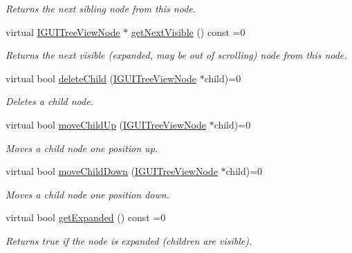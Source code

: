\begin{DoxyCompactItemize}
\begin{DoxyCompactList}\small\item\em Returns the next sibling node from this node. \end{DoxyCompactList}\item 
virtual \hyperlink{classirr_1_1gui_1_1IGUITreeViewNode}{I\+G\+U\+I\+Tree\+View\+Node} $\ast$ \hyperlink{classirr_1_1gui_1_1IGUITreeViewNode_add12cd0ee7b12a49c0f140741f9449fb}{get\+Next\+Visible} () const =0
\begin{DoxyCompactList}\small\item\em Returns the next visible (expanded, may be out of scrolling) node from this node. \end{DoxyCompactList}\item 
virtual bool \hyperlink{classirr_1_1gui_1_1IGUITreeViewNode_a26d0ce5bc0a6e7814f69d68033c30242}{delete\+Child} (\hyperlink{classirr_1_1gui_1_1IGUITreeViewNode}{I\+G\+U\+I\+Tree\+View\+Node} $\ast$child)=0
\begin{DoxyCompactList}\small\item\em Deletes a child node. \end{DoxyCompactList}\item 
virtual bool \hyperlink{classirr_1_1gui_1_1IGUITreeViewNode_a9e55b868695250c09e53e5fa961a812c}{move\+Child\+Up} (\hyperlink{classirr_1_1gui_1_1IGUITreeViewNode}{I\+G\+U\+I\+Tree\+View\+Node} $\ast$child)=0
\begin{DoxyCompactList}\small\item\em Moves a child node one position up. \end{DoxyCompactList}\item 
virtual bool \hyperlink{classirr_1_1gui_1_1IGUITreeViewNode_a3c7eb8a1b15c2018f32d13c3ce2ee219}{move\+Child\+Down} (\hyperlink{classirr_1_1gui_1_1IGUITreeViewNode}{I\+G\+U\+I\+Tree\+View\+Node} $\ast$child)=0
\begin{DoxyCompactList}\small\item\em Moves a child node one position down. \end{DoxyCompactList}\item 
\mbox{\label{classirr_1_1gui_1_1IGUITreeViewNode_a13e837050aa776602e3d0c98d9b303f4}} 
virtual bool \hyperlink{classirr_1_1gui_1_1IGUITreeViewNode_a13e837050aa776602e3d0c98d9b303f4}{get\+Expanded} () const =0
\begin{DoxyCompactList}\small\item\em Returns true if the node is expanded (children are visible). \end{DoxyCompactList}\item 

\end{DoxyCompactItemize}
